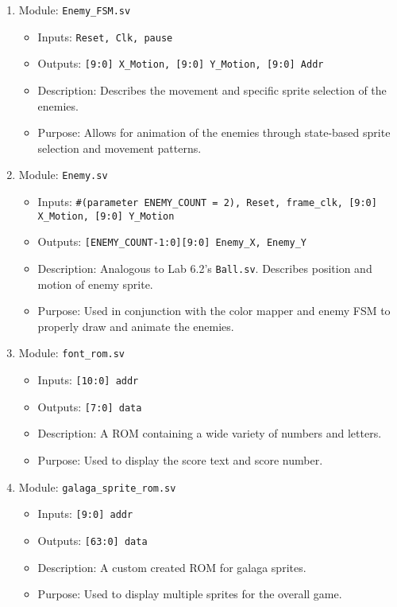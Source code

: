 \begin{enumerate}
  \item Module: \texttt{Enemy\_FSM.sv}
  \begin{itemize}
    \item Inputs: \texttt{Reset, Clk, pause} 
    \item Outputs: \texttt{[9:0] X\_Motion, [9:0] Y\_Motion, [9:0] Addr}
    \item Description: Describes the movement and specific sprite selection of the enemies.
    \item Purpose: Allows for animation of the enemies through state-based sprite selection and movement patterns.
  \end{itemize}
\pagebreak


    \item Module: \texttt{Enemy.sv}
    \begin{itemize}
        \item Inputs: \texttt{\#(parameter ENEMY\_COUNT = 2), Reset, frame\_clk, [9:0] X\_Motion, [9:0] Y\_Motion} 
        \item Outputs: \texttt{[ENEMY\_COUNT-1:0][9:0] Enemy\_X, Enemy\_Y}
        \item Description: Analogous to Lab 6.2's \texttt{Ball.sv}. Describes position and motion of enemy sprite.
        \item Purpose: Used in conjunction with the color mapper and enemy FSM to properly draw and animate the enemies.
    \end{itemize}
    
    \item Module: \texttt{font\_rom.sv}
    \begin{itemize}
        \item Inputs: \texttt{[10:0] addr} 
        \item Outputs: \texttt{[7:0] data}
        \item Description: A ROM containing a wide variety of numbers and letters. 
        \item Purpose: Used to display the score text and score number.
    \end{itemize}
    
    \item Module: \texttt{galaga\_sprite\_rom.sv}
    \begin{itemize}
        \item Inputs: \texttt{[9:0] addr} 
        \item Outputs: \texttt{[63:0] data}
        \item Description: A custom created ROM for galaga sprites.
        \item Purpose: Used to display multiple sprites for the overall game.
    \end{itemize}
    

\end{enumerate}
